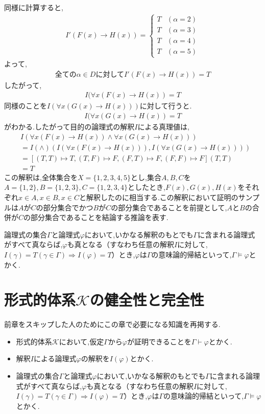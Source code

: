 \documentclass[10pt,b5paper,papersize,dvipdfmx]{jsbook}
\begin{document}
同様に計算すると,
\begin{align*}
I'(F(x)\to H(x))=
\begin{cases}
T&(\alpha = 2)\\
T&(\alpha = 3)\\
T&(\alpha = 4)\\
T&(\alpha = 5)
\end{cases}
\end{align*}
よって,
\begin{align*}
\mbox{全ての}\alpha \in D\mbox{に対して}I'(F(x)\to H(x))=T
\end{align*}
したがって,
\begin{align*}
I(\forall x(F(x)\to H(x))=T
\end{align*}
同様のことを$I(\forall x(G(x)\to H(x)))$に対して行うと.
\begin{align*}
I(\forall x(G(x)\to H(x))=T
\end{align*}
がわかる.したがって目的の論理式の解釈$I$による真理値は,
\begin{align*}
&I(\forall x(F(x)\to H(x))\land \forall x(G(x)\to H(x)))\\
&=I(\land)(I(\forall x(F(x)\to H(x))),I(\forall x(G(x)\to H(x))))\\
&=[(T,T)\mapsto T,(T,F)\mapsto F,(F,T)\mapsto F,(F,F)\mapsto F](T,T)\\
&=T
\end{align*}
この解釈は,全体集合を$X=\{1,2,3,4,5\}$とし,集合$A,B,C$を$A=\{1,2\},B=\{1,2,3\},C=\{1,2,3,4\}$としたとき,$F(x),G(x),H(x)$をそれぞれ$x\in A,x\in B,x\in C$と解釈したのに相当する.この解釈において証明のサンプルは$A$が$C$の部分集合でかつ$B$が$C$の部分集合であることを前提として,$A$と$B$の合併が$C$の部分集合であることを結論する推論を表す.\par
論理式の集合$\Gamma$と論理式$\varphi$において,いかなる解釈のもとでも$\Gamma$に含まれる論理式がすべて真ならば,$\varphi$も真となる（すなわち任意の解釈$I$に対して,$I(\gamma)=T(\gamma \in \Gamma)\Rightarrow I(\varphi)=T$）とき,$\varphi$は$\Gamma$の意味論的帰結といって,$\Gamma \models \varphi$とかく.

\section{形式的体系\texorpdfstring{$\mathcal K$}{K}の健全性と完全性}
前章をスキップした人のためにこの章で必要になる知識を再掲する.
\begin{itemize}
\item 形式的体系$\mathcal K$において,仮定$\Gamma$から$\varphi$が証明できることを$\Gamma \vdash \varphi$とかく.
\item 解釈$I$による論理式$\varphi$の解釈を$I(\varphi)$とかく.
\item 論理式の集合$\Gamma$と論理式$\varphi$において,いかなる解釈のもとでも$\Gamma$に含まれる論理式がすべて真ならば,$\varphi$も真となる（すなわち任意の解釈$I$に対して,$I(\gamma)=T(\gamma \in \Gamma)\Rightarrow I(\varphi)=T$）とき,$\varphi$は$\Gamma$の意味論的帰結といって,$\Gamma \models \varphi$とかく.
\end{itemize}
\end{document}
